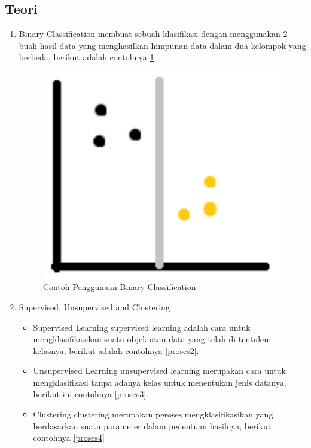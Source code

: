 \subsection{Teori}
\begin{enumerate}

\item Binary Classification
\subitem
membuat sebuah klasifikasi dengan menggunakan 2 buah hasil data yang menghasilkan himpunan data dalam dua kelompok yang berbeda. berikut adalah contohnya \ref{proses1}.
\begin{figure}
\centerline{\includegraphics[width=1\textwidth]{figures/fathi/chapter2/1.PNG}}
\caption{Contoh Penggunaan Binary Classification}
\label{proses1}
\end{figure}

\item Supervised, Unsupervised and Clustering
\begin{itemize}
\item Supervised Learning
supervised learning adalah cara untuk mengklasifikasikan suatu objek atau data yang telah di tentukan kelasnya, berikut adalah contohnya \ref{proses2}.
\item Unsupervised Learning
unsupervised learning merupakan cara untuk mengklasifikasi tanpa adanya kelas untuk menentukan jenis datanya, berikut ini contohnya \ref{proses3}.
\item Clustering
clustering merupakan peroses mengklasifikasikan yang berdasarkan suatu parameter dalam penentuan hasilnya, berikut contohnya \ref{proses4}
\end{itemize}


\end{enumerate}
